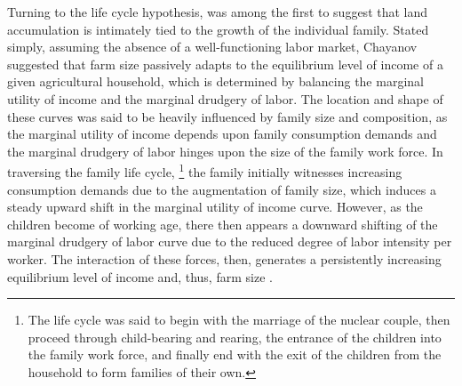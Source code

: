 \documentclass[english]{article}
\begin{document}
Turning to the life cycle hypothesis, \citet{chayanov1966} was among the first 
to suggest that land accumulation is intimately tied to the growth of the 
individual family. 
Stated simply, assuming the absence of a well-functioning labor market, 
Chayanov suggested that farm size passively adapts to the equilibrium level of 
income of a given agricultural household, which is determined by balancing 
the marginal utility of income and the marginal drudgery of labor. 
The location and shape of these curves was said to be heavily influenced by 
family size and composition, as the marginal utility of income depends upon 
family consumption demands and the marginal drudgery of labor hinges upon 
the size of the family work force. 
In traversing the family life cycle,%
\footnote{The life cycle was said to begin with the marriage of the nuclear 
couple, then proceed through child-bearing and rearing, the entrance of the 
children into the family work force, and finally end with the exit of the children 
from the household to form families of their own.} 
the family initially witnesses increasing consumption demands due to the 
augmentation of family size, which induces a steady upward shift in the 
marginal utility of income curve. 
However, as the children become of working age, there then appears a 
downward shifting of the marginal drudgery of labor curve due to the reduced 
degree of labor intensity per worker. 
The interaction of these forces, then, generates a persistently increasing 
equilibrium level of income and, thus, farm size 
\citep{harrison1975, banaji1976}. 
\end{document}
